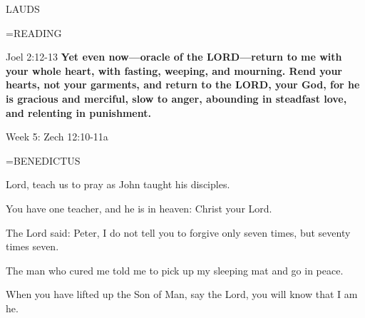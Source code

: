 \begin{flushleft}\normalsize LAUDS\\\end{flushleft}
\hangindent=\parindent \small READING
\begin{description}[labelindent=\parindent, leftmargin=*]
\item [Weeks 1-4:]     Joel 2:12-13 \textbf{    Yet even now—oracle of the LORD—return to me with your whole heart, with fasting, weeping, and mourning. Rend your hearts, not your garments, and return to the LORD, your God, for he is gracious and merciful, slow to anger, abounding in steadfast love, and relenting in punishment.}
\end{description}

Week 5:    Zech 12:10-11a    

\hangindent=\parindent \small BENEDICTUS
\begin{description}[labelindent=\parindent, noitemsep, leftmargin=*]
\item [Week 1:] 	Lord, teach us to pray as John taught his disciples.
\item [Week 2:] 	You have one teacher, and he is in heaven: Christ your Lord.
\item [Week 3:] 	The Lord said: Peter, I do not tell you to forgive only seven times, but seventy times seven.
\item [Week 4:] 	The man who cured me told me to pick up my sleeping mat and go in peace.
\item [Week 5:] 	When you have lifted up the Son of Man, say the Lord, you will know that I am he.
\end{description}

